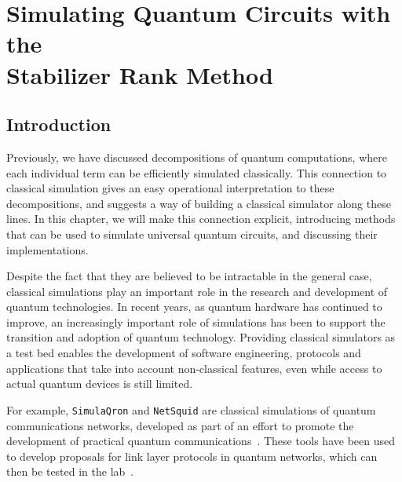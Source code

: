 
\chapter[Simulating Quantum Circuits with Stabilizer Rank]{Simulating Quantum Circuits with the\\ Stabilizer Rank Method}\label{chap:simulator}
\section{Introduction}\label{sec:simulator_intro}
Previously, we have discussed decompositions of quantum computations, where each individual term can be efficiently simulated classically. This connection to classical simulation gives an easy operational interpretation to these decompositions, and suggests a way of building a classical simulator along these lines. In this chapter, we will make this connection explicit, introducing methods that can be used to simulate universal quantum circuits, and discussing their implementations.\par
Despite the fact that they are believed to be intractable in the general case, classical simulations play an important role in the research and development of quantum technologies. In recent years, as quantum hardware has continued to improve, an increasingly important role of simulations has been to support the transition and adoption of quantum technology. Providing classical simulators as a test bed enables the development of software engineering, protocols and applications that take into account non-classical features, even while access to actual quantum devices is still limited. \par
For example, \texttt{SimulaQron} and \texttt{NetSquid} are classical simulations of quantum communications networks, developed as part of an effort to promote the development of practical quantum communications~\cite{Dahlberg2017,NetSquid}. These tools have been used to develop proposals for link layer protocols in quantum networks, which can then be tested in the lab~\cite{Dahlberg2019}.\par
